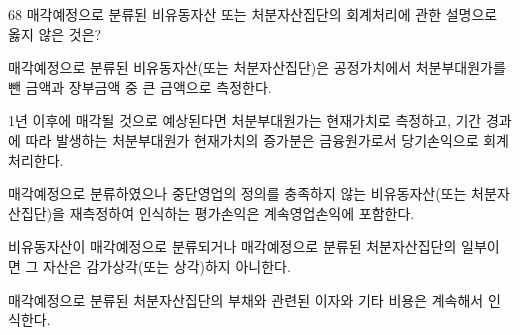 \begin{question}{68}
매각예정으로 분류된 비유동자산 또는 처분자산집단의 회계처리에 관한 설명으로 옳지 않은 것은?
\begin{choices}
  \item 매각예정으로 분류된 비유동자산(또는 처분자산집단)은 공정가치에서 처분부대원가를 뺀 금액과 장부금액 중 큰 금액으로 측정한다.
  \item 1년 이후에 매각될 것으로 예상된다면 처분부대원가는 현재가치로 측정하고, 기간 경과에 따라 발생하는 처분부대원가 현재가치의 증가분은 금융원가로서 당기손익으로 회계처리한다.
  \item 매각예정으로 분류하였으나 중단영업의 정의를 충족하지 않는 비유동자산(또는 처분자산집단)을 재측정하여 인식하는 평가손익은 계속영업손익에 포함한다.
  \item 비유동자산이 매각예정으로 분류되거나 매각예정으로 분류된 처분자산집단의 일부이면 그 자산은 감가상각(또는 상각)하지 아니한다.
  \item 매각예정으로 분류된 처분자산집단의 부채와 관련된 이자와 기타 비용은 계속해서 인식한다.
\end{choices}
\end{question}
